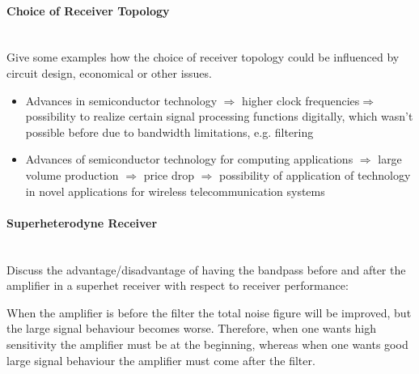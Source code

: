 \paragraph{Choice of Receiver Topology}\mbox{}\\
Give some examples how the choice of receiver topology could be influenced by circuit design, economical or other issues. 

\begin{itemize}
    \item Advances in semiconductor technology $\Rightarrow$ higher clock frequencies$\Rightarrow$ possibility to realize certain signal processing functions digitally, which wasn't possible before due to bandwidth limitations, e.g. filtering
    \item Advances of semiconductor technology for computing applications $\Rightarrow$ large volume production $\Rightarrow$ price drop $\Rightarrow$ possibility of application of technology in novel applications for wireless telecommunication systems
\end{itemize}





\paragraph{Superheterodyne Receiver}\mbox{}\\
Discuss the advantage/disadvantage of having the bandpass before and after the amplifier in a superhet receiver with respect to receiver performance:


When the amplifier is before the filter the total noise figure will be improved, but the large signal behaviour becomes worse. Therefore, when one wants high sensitivity the amplifier must be at the beginning, whereas when one wants good large signal behaviour the amplifier must come after the filter.
